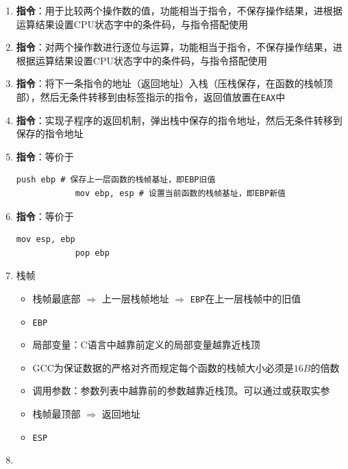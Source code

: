 \documentclass[./computer-organization-and-architecture.tex]{subfiles}
\begin{document}
\begin{enumerate}
        \item \textbf{指令}：用于比较两个操作数的值，功能相当于指令，不保存操作结果，进根据运算结果设置CPU状态字中的条件码，与指令搭配使用
        \item \textbf{指令}：对两个操作数进行逐位与运算，功能相当于指令，不保存操作结果，进根据运算结果设置CPU状态字中的条件码，与指令搭配使用
        \item \textbf{指令}：将下一条指令的地址（返回地址）入栈（压栈保存，在函数的栈帧顶部），然后无条件转移到由标签指示的指令，返回值放置在\texttt{EAX}中
        \item \textbf{指令}：实现子程序的返回机制，弹出栈中保存的指令地址，然后无条件转移到保存的指令地址
        \item \textbf{指令}：等价于
        \begin{lstlisting}[language={[x86masm]Assembler}]
            push ebp # 保存上一层函数的栈帧基址，即EBP旧值
            mov ebp, esp # 设置当前函数的栈帧基址，即EBP新值
        \end{lstlisting}
        \item \textbf{指令}：等价于
        \begin{lstlisting}[language={[x86masm]Assembler}]
            mov esp, ebp
            pop ebp
        \end{lstlisting}
        \item 栈帧
        \begin{itemize}
            \item 栈帧最底部 $\Rightarrow$ 上一层栈帧地址 $\Rightarrow$ \texttt{EBP}在上一层栈帧中的旧值
            \item \texttt{EBP}
            \item 局部变量：C语言中越靠前定义的局部变量越靠近栈顶
            \item GCC为保证数据的严格对齐而规定每个函数的栈帧大小必须是$16B$的倍数
            \item 调用参数：参数列表中越靠前的参数越靠近栈顶。可以通过或获取实参
            \item 栈帧最顶部 $\Rightarrow$ 返回地址
            \item \texttt{ESP}
        \end{itemize}
        \item
        \begin{analysisbox}
            \begin{lstlisting}[language={[x86masm]Assembler}]

\end{lstlisting}
\end{analysisbox}
\end{enumerate}
\end{document}
